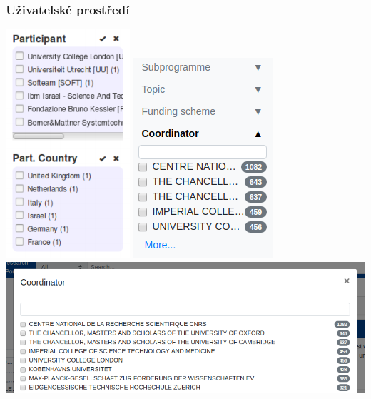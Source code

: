 \documentclass[10pt,xcolor=pdflatex]{beamer}
\begin{document}
\begin{frame}
    \frametitle{Uživatelské prostředí}
    \begin{center}
        \includegraphics[scale=0.35]{stanek-sidepanel.png}
        \hspace{0.2cm}
        \includegraphics[scale=0.35]{my-sidepanel.png}
        \vspace{0.2cm}
        \includegraphics[scale=0.3]{my-modal.png}
    \end{center}
\end{frame}
\end{document}
